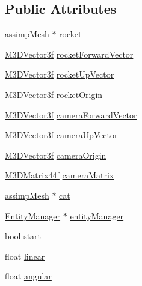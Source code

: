 \subsection*{Public Attributes}
\begin{DoxyCompactItemize}
\item 
\hyperlink{classassimp_mesh}{assimp\-Mesh} $\ast$ \hyperlink{class_level1_a27e8e0e393395dbcb01b4317d05a922e}{rocket}
\item 
\hyperlink{math3d_8h_a2163fe22bd4208b846d22ec7e74cf858}{M3\-D\-Vector3f} \hyperlink{class_level1_a052318511122312a63806a8f7e999417}{rocket\-Forward\-Vector}
\item 
\hyperlink{math3d_8h_a2163fe22bd4208b846d22ec7e74cf858}{M3\-D\-Vector3f} \hyperlink{class_level1_af64a6427f0f7ac73ee16d1d6d4bc3162}{rocket\-Up\-Vector}
\item 
\hyperlink{math3d_8h_a2163fe22bd4208b846d22ec7e74cf858}{M3\-D\-Vector3f} \hyperlink{class_level1_abc8a371bf1f22d4abae3fcd7f52a4188}{rocket\-Origin}
\item 
\hyperlink{math3d_8h_a2163fe22bd4208b846d22ec7e74cf858}{M3\-D\-Vector3f} \hyperlink{class_level1_ac10903be550984ca56c7511a5a15a025}{camera\-Forward\-Vector}
\item 
\hyperlink{math3d_8h_a2163fe22bd4208b846d22ec7e74cf858}{M3\-D\-Vector3f} \hyperlink{class_level1_a274b6360e2d328afa0a9e6965821fcdc}{camera\-Up\-Vector}
\item 
\hyperlink{math3d_8h_a2163fe22bd4208b846d22ec7e74cf858}{M3\-D\-Vector3f} \hyperlink{class_level1_a92a12d05696e7cca7cf8ad9593d14d69}{camera\-Origin}
\item 
\hyperlink{math3d_8h_a1e8690467d81d5ed97c5ecc3a144a4ac}{M3\-D\-Matrix44f} \hyperlink{class_level1_a6001495527da0e497c56f0136c92eb88}{camera\-Matrix}
\item 
\hyperlink{classassimp_mesh}{assimp\-Mesh} $\ast$ \hyperlink{class_level1_aef332d331ec58d349e53cf6fb7dd951e}{cat}
\item 
\hyperlink{class_entity_manager}{Entity\-Manager} $\ast$ \hyperlink{class_level1_aa9917581ef00ebe786fa2f89bdb5a765}{entity\-Manager}
\item 
bool \hyperlink{class_level1_a7ccfe53965cd6952089cad249f0e593f}{start}
\item 
float \hyperlink{class_level1_acc67ce4d008a8f081378139ed81ea9da}{linear}
\item 
float \hyperlink{class_level1_ad0e4b54788124f6471852123dea5a073}{angular}
\end{DoxyCompactItemize}


